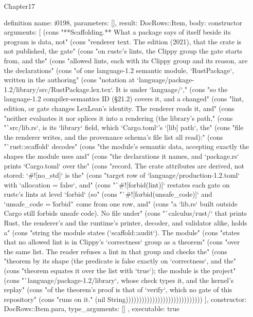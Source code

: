 \begin{lexlean}{Chapter17}
\begin{semanticmodule}
definition{
  name: i0198,
  parameters: [],
  result: DocRows::Item,
  body: constructor{
    arguments: [
      (cons "**Scaffolding.** What a package says of itself beside its program is data, not" (cons "renderer text. The edition (2021), that the crate is not published, the gate" (cons "on rustc's lints, the Clippy group the gate starts from, and the" (cons "allowed lints, each with its Clippy group and its reason, are the declarations" (cons "of one language-1.2 semantic module, `RustPackage`, written in the authoring" (cons "notation at `language/package-1.2/library/src/RustPackage.lex.tex`. It is under `language/`," (cons "so the language-1.2 compiler-semantics ID (§21.2) covers it, and a changed" (cons "lint, edition, or gate changes LexLean's identity. The renderer reads it, and" (cons "neither evaluates it nor splices it into a rendering (the library's path," (cons "`src/lib.rs`, is its `library` field, which `Cargo.toml`'s `[lib] path`, the" (cons "file the renderer writes, and the provenance schema's file list all read):" (cons "`rust::scaffold` decodes" (cons "the module's semantic data, accepting exactly the shapes the module uses and" (cons "the declarations it names, and `package.rs` prints `Cargo.toml` over the" (cons "record. The crate attributes are derived, not stored: `#![no_std]` is the" (cons "target row of `language/production-1.2.toml` with `allocation = false`, and" (cons "`#![forbid(lint)]` restates each gate on rustc's lints at level `forbid` (so" (cons "`#![forbid(unsafe_code)]` and `unsafe_code = \"forbid\"` come from one row, and" (cons "a `lib.rs` built outside Cargo still forbids unsafe code). No file under" (cons "`calculus/rust/` that prints Rust, the renderer's and the runtime's printer, decoder, and validator alike, holds a" (cons "string the module states (`scaffold::audit`). The module" (cons "states that no allowed lint is in Clippy's `correctness` group as a theorem" (cons "over the same list. The reader refuses a lint in that group and checks the" (cons "theorem by its shape (the predicate is false exactly on `correctness`, and the" (cons "theorem equates it over the list with `true`); the module is the project" (cons "`language/package-1.2/library`, whose check types it, and the kernel's replay" (cons "of the theorem's proof is that of `verify`, which no gate of this repository" (cons "runs on it." (nil String)))))))))))))))))))))))))))))
    ],
    constructor: DocRows::Item.para,
    type_arguments: []
  },
  executable: true
}


\end{semanticmodule}
\end{lexlean}

